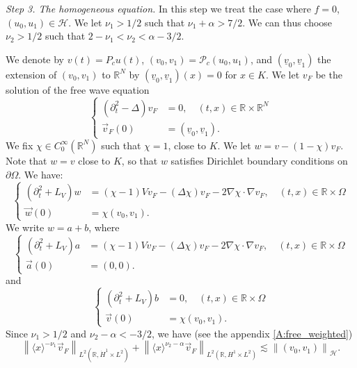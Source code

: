 \documentclass[10pt,leqno]{amsart}
\theoremstyle{definition}%
\theoremstyle{remark}
\numberwithin{equation}{section}
\newcommand{\R}{\mathbb{R}}
\renewcommand{\^}{\widehat}%
\newcommand{\la}{\langle}
\newcommand{\ra}{\rangle}
\newcommand{\HHH}{\mathcal{H}}
\newcommand{\PPP}{\mathcal{P}}
\newcommand{\uv}{\underline{v}}
\begin{document}
	\smallskip
	
	\noindent\emph{Step 3. The homogeneous equation.} In this step we treat the case where $f=0$, $(u_0,u_1)\in \HHH$. We let $\nu_1>1/2$ such that $\nu_1+\alpha>7/2$. We can thus choose $\nu_2>1/2$ such that $2-\nu_1<\nu_2<\alpha-3/2$.
	
	We denote by $v(t)=P_cu(t)$, $(v_0,v_1)=\PPP_c(u_0,u_1)$, and $(\underline{v}_0,\underline{v}_1)$ the extension of $(v_0,v_1)$ to $\R^N$ by $(\uv_0,\uv_1)(x)=0$ for $x\in K$.  We let $v_F$ be the solution of the free wave equation
	\begin{equation}
	\label{FW}
	\left\{
	\begin{aligned}
	(\partial_t^2-\Delta)v_F&=0,\quad (t,x)\in \R\times \R^N\\
	\vec{v}_F(0)&=(\uv_0,\uv_1).
	\end{aligned}\right.
	\end{equation} 
	We fix $\chi\in C_0^{\infty}(\R^N)$ such that $\chi=1$, close to $K$. We let $w=v-(1-\chi) v_F$. Note that $w=v$ close to $K$, so that $w$ satisfies Dirichlet boundary conditions on $\partial \Omega$. We have:
	\begin{equation*}
	\left\{
	\begin{aligned}
	(\partial_t^2+L_V)w&=(\chi-1)Vv_F-(\Delta \chi)v_F-2\nabla \chi\cdot\nabla v_F,\quad (t,x)\in \R\times \Omega\\
	\vec{w}(0)&=\chi(v_0,v_1).
	\end{aligned}\right.
	\end{equation*} 
	We write $w=a+b$, where
	\begin{equation}
	\label{inh40}
	\left\{
	\begin{aligned}
	(\partial_t^2+L_V)a&=(\chi-1)Vv_F-(\Delta \chi)v_F-2\nabla \chi\cdot\nabla v_F,\quad (t,x)\in \R\times \Omega\\
	\vec{a}(0)&=(0,0).
	\end{aligned}\right.
	\end{equation}
	and
	\begin{equation}
	\label{inh41}
	\left\{
	\begin{aligned}
	(\partial_t^2+L_V)b&=0,\quad (t,x)\in \R\times \Omega\\
	\vec{v}(0)&=\chi(v_0,v_1).
	\end{aligned}\right.
	\end{equation} 
	Since $\nu_1>1/2$ and $\nu_2-\alpha<-3/2$, we have (see the appendix  \ref{A:free_weighted})
	\begin{equation}
	\label{inh42}
	\left\| \la x\ra^{-\nu_1}\vec{v}_F\right\|_{L^2(\R,\dot{H}^1\times L^2)}+
	\left\| \la x\ra^{\nu_2-\alpha}\vec{v}_F\right\|_{L^2(\R,H^1\times L^2)}\lesssim \left\|(v_0,v_1)\right\|_{\HHH}.
	\end{equation}
\end{document}
